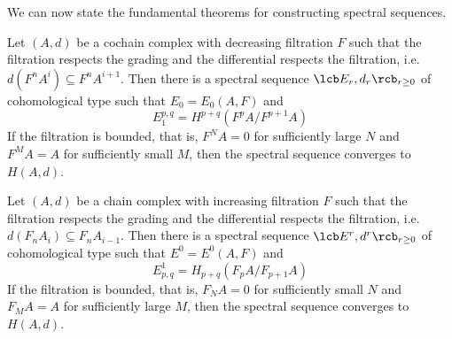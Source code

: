 We can now state the fundamental theorems for constructing spectral sequences.

\begin{thm}
\label{fundamental theorem cohomological spectral sequence}
Let $(A,d)$ be a cochain complex with decreasing filtration $F$ such that the filtration respects the grading and the differential respects the filtration, i.e. $d(F^n A^i) \subseteq F^n A^{i+1}$. Then there is a spectral sequence $\lcb E_r,d_r \rcb_{r \geq 0}$ of cohomological type such that $E_0 = E_0(A,F)$ and
\[ E_1^{p,q} = H^{p+q}(F^p A / F^{p+1} A) \]
If the filtration is bounded, that is, $F^N A = 0$ for sufficiently large $N$ and $F^M A = A$ for sufficiently small $M$, then the spectral sequence converges to $H(A,d)$.
\end{thm}

\begin{thm}
\label{fundamental theorem homological spectral sequence}
Let $(A,d)$ be a chain complex with increasing filtration $F$ such that the filtration respects the grading and the differential respects the filtration, i.e. $d(F_n A_i) \subseteq F_n A_{i-1}$. Then there is a spectral sequence $\lcb E^r,d^r \rcb_{r \geq 0}$ of cohomological type such that $E^0 = E^0(A,F)$ and
\[ E^1_{p,q} = H_{p+q}(F_p A / F_{p+1} A) \]
If the filtration is bounded, that is, $F_N A = 0$ for sufficiently small $N$ and $F_M A = A$ for sufficiently large $M$, then the spectral sequence converges to $H(A,d)$.
\end{thm}

